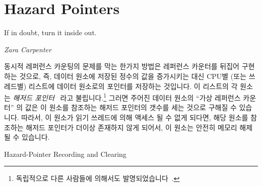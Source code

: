 
\section{Hazard Pointers}
\label{sec:defer:Hazard Pointers}
%
\epigraph{If in doubt, turn it inside out.}{\emph{Zara Carpenter}}

동시적 레퍼런스 카운팅의 문제를 막는 한가지 방법은 레퍼런스 카운터를 뒤집어
구현하는 것으로, 즉, 데이터 원소에 저장된 정수의 값을 증가시키는 대신 CPU별
(또는 쓰레드별) 리스트에 데이터 원소로의 포인터를 저장하는 것입니다.
이 리스트의 각 원소는 \emph{해저드 포인터}~\cite{MagedMichael04a} 라고
불립니다.\footnote{
	독립적으로 다른 사람들에 의해서도 발명되었습니다~\cite{HerlihyLM02}.}
그러면 주어진 데이터 원소의 ``가상 레퍼런스 카운터'' 의 값은 이 원소를 참조하는
해저드 포인터의 갯수를 세는 것으로 구해질 수 있습니다.
따라서, 이 원소가 읽기 쓰레드에 의해 액세스 될 수 없게 되다면, 해당 원소를
참조하는 해저드 포인터가 더이상 존재하지 않게 되어서, 이 원소는 안전히 메모리
해제될 수 있습니다.

\begin{listing}[tbp]

\caption{Hazard-Pointer Recording and Clearing}
\label{lst:defer:Hazard-Pointer Recording and Clearing}
\end{listing}

